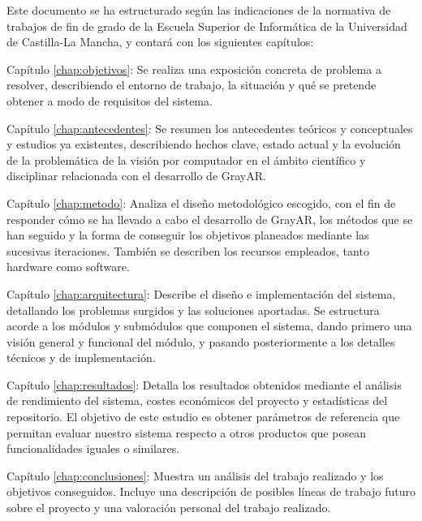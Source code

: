   Este documento se ha estructurado según las indicaciones de la normativa de trabajos de fin de grado de la Escuela Superior de Informática de la Universidad de Castilla-La Mancha, y contará con los siguientes capítulos:
  \begin{definitionlist}
  \item[Capítulo \ref{chap:objetivos}: \nameref{chap:objetivos}] Se realiza una exposición concreta de problema a resolver, describiendo el entorno de trabajo, la situación y qué se pretende obtener a modo de requisitos del sistema.

  \item[Capítulo \ref{chap:antecedentes}: \nameref{chap:antecedentes}] Se resumen los antecedentes teóricos y conceptuales y estudios ya existentes, describiendo hechos clave, estado actual y la evolución de la problemática de la visión por computador en el ámbito científico y disciplinar relacionada con el desarrollo de GrayAR.

  \item[Capítulo \ref{chap:metodo}: \nameref{chap:metodo}] Analiza el diseño metodológico escogido, con el fin de responder cómo se ha llevado a cabo el desarrollo de GrayAR, los métodos que se han seguido y la forma de conseguir los objetivos planeados mediante las sucesivas iteraciones. También se describen los recursos empleados, tanto hardware como software.

  \item[Capítulo \ref{chap:arquitectura}: \nameref{chap:arquitectura}] Describe el diseño e implementación del sistema, detallando los problemas surgidos y las soluciones aportadas. Se estructura acorde a los módulos y submódulos que componen el sistema, dando primero una visión general y funcional del módulo, y pasando posteriormente a los detalles técnicos y de implementación. 

  \item[Capítulo \ref{chap:resultados}: \nameref{chap:resultados}] Detalla los resultados obtenidos mediante el análisis de rendimiento del sistema, costes económicos del proyecto y estadísticas del repositorio. El objetivo de este estudio es obtener parámetros de referencia que permitan evaluar nuestro sistema respecto a otros productos que posean funcionalidades iguales o similares.

  \item[Capítulo \ref{chap:conclusiones}: \nameref{chap:conclusiones}] Muestra un análisis del trabajo realizado y los objetivos conseguidos. Incluye una descripción de posibles líneas de trabajo futuro sobre el proyecto y una valoración personal del trabajo realizado.

  \end{definitionlist}



